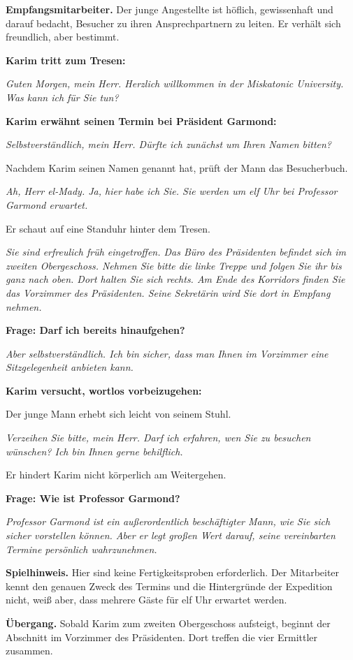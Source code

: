 \begin{meisterinfo}
\textbf{Empfangsmitarbeiter.} Der junge Angestellte ist höflich, gewissenhaft und darauf bedacht, Besucher zu ihren Ansprechpartnern zu leiten. Er verhält sich freundlich, aber bestimmt.

\medskip
\textbf{Karim tritt zum Tresen:}

\emph{\glqq{}Guten Morgen, mein Herr. Herzlich willkommen in der Miskatonic University. Was kann ich für Sie tun?\grqq{}}

\medskip
\textbf{Karim erwähnt seinen Termin bei Präsident Garmond:}

\emph{\glqq{}Selbstverständlich, mein Herr. Dürfte ich zunächst um Ihren Namen bitten?\grqq{}}

Nachdem Karim seinen Namen genannt hat, prüft der Mann das Besucherbuch.

\emph{\glqq{}Ah, Herr el-Mady. Ja, hier habe ich Sie. Sie werden um elf Uhr bei Professor Garmond erwartet.\grqq{}}

Er schaut auf eine Standuhr hinter dem Tresen.

\emph{\glqq{}Sie sind erfreulich früh eingetroffen. Das Büro des Präsidenten befindet sich im zweiten Obergeschoss. Nehmen Sie bitte die linke Treppe und folgen Sie ihr bis ganz nach oben. Dort halten Sie sich rechts. Am Ende des Korridors finden Sie das Vorzimmer des Präsidenten. Seine Sekretärin wird Sie dort in Empfang nehmen.\grqq{}}

\medskip
\textbf{Frage: Darf ich bereits hinaufgehen?}

\emph{\glqq{}Aber selbstverständlich. Ich bin sicher, dass man Ihnen im Vorzimmer eine Sitzgelegenheit anbieten kann.\grqq{}}

\medskip
\textbf{Karim versucht, wortlos vorbeizugehen:}

Der junge Mann erhebt sich leicht von seinem Stuhl.

\emph{\glqq{}Verzeihen Sie bitte, mein Herr. Darf ich erfahren, wen Sie zu besuchen wünschen? Ich bin Ihnen gerne behilflich.\grqq{}}

Er hindert Karim nicht körperlich am Weitergehen.

\medskip
\textbf{Frage: Wie ist Professor Garmond?}

\emph{\glqq{}Professor Garmond ist ein au\ss{}erordentlich beschäftigter Mann, wie Sie sich sicher vorstellen können. Aber er legt gro\ss{}en Wert darauf, seine vereinbarten Termine persönlich wahrzunehmen.\grqq{}}

\medskip
\textbf{Spielhinweis.} Hier sind keine Fertigkeitsproben erforderlich. Der Mitarbeiter kennt den genauen Zweck des Termins und die Hintergründe der Expedition nicht, wei\ss{} aber, dass mehrere Gäste für elf Uhr erwartet werden.

\textbf{Übergang.} Sobald Karim zum zweiten Obergeschoss aufsteigt, beginnt der Abschnitt im Vorzimmer des Präsidenten. Dort treffen die vier Ermittler zusammen.
\end{meisterinfo}
